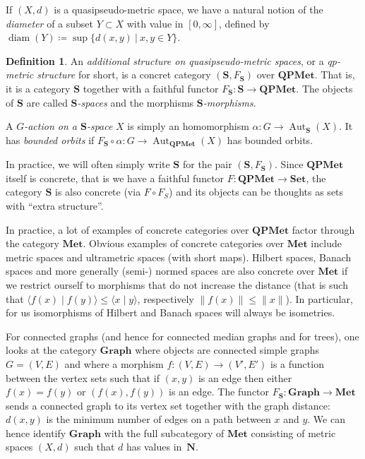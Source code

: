 \documentclass[a4paper]{article}
\theoremstyle{definition}
\newtheorem{defn}[lem]{Definition}
\DeclareMathOperator\Aut{Aut}
\DeclareMathOperator\diam{diam}
\newcommand*{\field}[1]{\mathbf{#1}}
\newcommand*{\N}{\field{N}}
\newcommand{\setst}[2]{\{#1\ |\ #2\}}
\begin{document}
If $(X,d)$ is a quasipseudo-metric space, we have a natural notion of the  \emph{diameter} of a subset $Y\subset X$ with value in $[0,\infty]$, defined by $\diam(Y)\coloneqq\sup\setst{d(x,y)}{x,y\in Y}$.
%
%
\begin{defn}\label{Def:Categoric}
An \emph{additional structure on quasipseudo-metric spaces}, or a \emph{qp-metric structure} for short, is a concret category $(\mathbf S,F_{\mathbf S})$ over $\mathbf{QPMet}$.
That is, it is a category $\mathbf{S}$ together with a faithful functor $F_{\mathbf S}\colon \mathbf{S}\to \mathbf{QPMet}$.
The objects of $\mathbf{S}$ are called \emph{$\mathbf S$-spaces} and the morphisms \emph{$\mathbf S$-morphisms}.

A \emph{$G$-action on a $\mathbf S$-space} $X$ is simply an homomorphism $\alpha\colon G\to\Aut_{\mathbf{S}}(X)$. It has \emph{bounded orbits} if $F_{\mathbf S}\circ \alpha\colon G\to \Aut_{\mathbf{QPMet}}(X)$ has bounded orbits.
\end{defn}
%
%
In practice, we will often simply write $\mathbf{S}$  for the pair $(\mathbf{S},F_{\mathbf{S}})$.
Since $\mathbf{QPMet}$ itself is concrete, that is we have a faithful functor $F\colon \mathbf{QPMet}\to\mathbf{Set}$, the category $\mathbf{S}$ is also concrete (via $F\circ F_S$) and its objects can be thoughts as sets with ``extra structure''.

In practice, a lot of examples of concrete categories over $\mathbf{QPMet}$ factor through the category $\mathbf{Met}$.
Obvious examples of concrete categories over $\mathbf{Met}$ include metric spaces and ultrametric spaces (with short maps).
Hilbert spaces, Banach spaces and more generally (semi-) normed spaces are also concrete over $\mathbf{Met}$ if we restrict ourself to morphisms that do not increase the distance (that is such that $\langle f(x)\mid f(y)\rangle\leq\langle x\mid y\rangle$, respectively $\|f(x)\|\leq\| x\|$). In particular, for us isomorphisms of Hilbert and Banach spaces will always be isometries.
 
For connected graphs (and hence for connected median graphs and for trees), one looks at the category $\mathbf{Graph}$ where objects are connected simple graphs $G=(V,E)$ and where a morphism $f\colon (V,E)\to(V',E')$ is a function between the vertex sets such that if $(x,y)$ is an edge then either $f(x)=f(y)$ or $(f(x),f(y))$ is an edge.
The functor $F_{\mathbf S}\colon\mathbf{Graph}\to\mathbf{Met}$ sends a connected graph to its vertex set together with the graph distance: $d(x,y)$ is the minimum number of edges on a path between $x$ and $y$.
We can hence identify $\mathbf{Graph}$ with the full subcategory of $\mathbf{Met}$ consisting of metric spaces $(X,d)$ such that $d$ has values in~$\N$.
\end{document}
